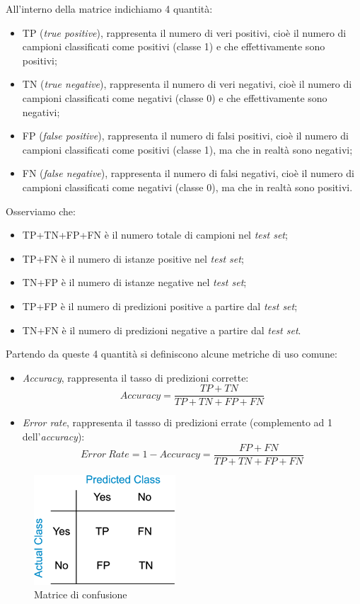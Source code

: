 All'interno della matrice indichiamo 4 quantità:
\begin{itemize}
\item TP (\emph{true positive}), rappresenta il numero di veri positivi, cioè il numero di campioni classificati come positivi (classe 1) e che effettivamente sono positivi;
\item TN (\emph{true negative}), rappresenta il numero di veri negativi, cioè il numero di campioni classificati come negativi (classe 0) e che effettivamente sono negativi;
\item FP (\emph{false positive}), rappresenta il numero di falsi positivi, cioè il numero di campioni classificati come positivi (classe 1), ma che in realtà sono negativi;
\item FN (\emph{false negative}), rappresenta il numero di falsi negativi, cioè il numero di campioni classificati come negativi (classe 0), ma che in realtà sono positivi.
\end{itemize}
Osserviamo che:
\begin{itemize}
\item TP+TN+FP+FN è il  numero totale di campioni nel \emph{test set};
\item TP+FN è il numero di istanze positive nel \emph{test set};
\item TN+FP è il numero di istanze negative nel \emph{test set};
\item TP+FP è il numero di predizioni positive a partire dal \emph{test set};
\item TN+FN è il numero di predizioni negative a partire dal \emph{test set}.
\end{itemize}
Partendo da queste 4 quantità si definiscono alcune metriche di uso comune:
\begin{itemize}
\item \emph{Accuracy}, rappresenta il tasso di predizioni corrette:
\begin{equation*}
Accuracy = \frac{TP + TN}{TP+TN+FP+FN}
\end{equation*}
\item \emph{Error rate}, rappresenta il tassso di predizioni errate (complemento ad 1 dell'\emph{accuracy}):
\begin{equation*}
Error~Rate = 1 - Accuracy = \frac{FP + FN}{TP+TN+FP+FN}
\end{equation*}
\end{itemize}

\begin{figure}[]
\centering
  \includegraphics[width=0.3 \textwidth]{images/confusionmatrix}
  \caption{Matrice di confusione}
  \label{fig:confusione}
\end{figure}


